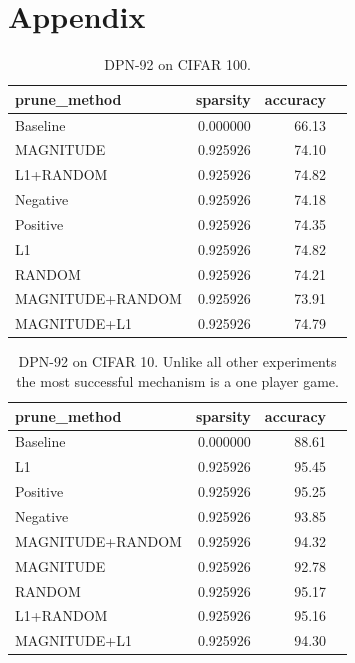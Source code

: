 \documentclass[11pt]{article}
\begin{document}
\section{Appendix}
\begin{table}[h]
\begin{tabular}{|l|r|r|r|}
\hline
     prune\_method &  sparsity &  accuracy \\ \hline
     Baseline  &  0.000000 &     66.13 \\ \hline
        MAGNITUDE &  0.925926 &     74.10 \\ \hline
        L1+RANDOM &  0.925926 &     74.82 \\ \hline
         Negative &  0.925926 &     74.18 \\ \hline
         Positive &  0.925926 &     74.35 \\ \hline
               L1 &  0.925926 &     74.82 \\ \hline
           RANDOM &  0.925926 &     74.21 \\ \hline
 MAGNITUDE+RANDOM &  0.925926 &     73.91 \\ \hline
     MAGNITUDE+L1 &  0.925926 &     74.79 \\ \hline
\end{tabular}
\label{tab:cifar100-DPN92}
\caption{DPN-92 on CIFAR 100. }
\end{table}


\begin{table}[h]
\begin{tabular}{|l|r|r|r|}
\hline
     prune\_method &  sparsity &  accuracy \\ \hline
   Baseline  &  0.000000 &     88.61 \\ \hline
               L1 &  0.925926 &     95.45 \\ \hline
         Positive &  0.925926 &     95.25 \\ \hline
         Negative &  0.925926 &     93.85 \\ \hline
 MAGNITUDE+RANDOM &  0.925926 &     94.32 \\ \hline
        MAGNITUDE &  0.925926 &     92.78 \\ \hline
           RANDOM &  0.925926 &     95.17 \\ \hline
        L1+RANDOM &  0.925926 &     95.16 \\ \hline
     MAGNITUDE+L1 &  0.925926 &     94.30 \\ \hline 
\end{tabular}
\label{tab:cifar10-DPN92}
\caption{DPN-92 on CIFAR 10. Unlike all other experiments the most successful mechanism is a one player game.}
\end{table}
\end{document}
